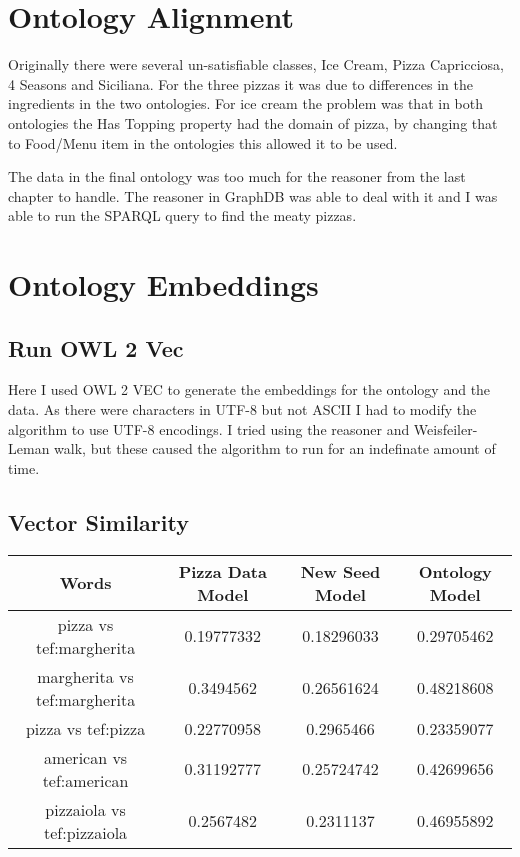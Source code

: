 \documentclass[11pt]{report} %
\begin{document}
\chapter{Ontology Alignment}
Originally there were several un-satisfiable classes, Ice Cream, Pizza Capricciosa, 4 Seasons and Siciliana.
For the three pizzas it was due to differences in the ingredients in the two ontologies.
For ice cream the problem was that in both ontologies the Has Topping property had the domain of pizza, by changing that to Food/Menu item in the ontologies this allowed it to be used.

The data in the final ontology was too much for the reasoner from the last chapter to handle.
The reasoner in GraphDB was able to deal with it and I was able to run the SPARQL query to find the meaty pizzas.



\chapter{Ontology Embeddings}

\section{Run OWL 2 Vec}
Here I used OWL 2 VEC to generate the embeddings for the ontology and the data.
As there were characters in UTF-8 but not ASCII I had to modify the algorithm to use UTF-8 encodings.
I tried using the reasoner and Weisfeiler-Leman walk, but these caused the algorithm to run for an indefinate amount of time.

\section{Vector Similarity}
\begin{center}
	\begin{tabular}{ | c | c | c | c |}
		\hline
		\textbf{Words} & \textbf{Pizza Data Model} & \textbf{New Seed Model} & \textbf{Ontology Model} \\
		\hline
		pizza vs tef:margherita & 0.19777332 & 0.18296033 & 0.29705462 \\
		\hline
		margherita vs tef:margherita & 0.3494562 & 0.26561624 & 0.48218608 \\
		\hline
		pizza vs tef:pizza & 0.22770958 & 0.2965466 & 0.23359077 \\
		\hline
		american vs tef:american & 0.31192777 & 0.25724742 & 0.42699656 \\
		\hline
		pizzaiola vs tef:pizzaiola & 0.2567482 & 0.2311137 & 0.46955892 \\
		\hline
	\end{tabular}
\end{center}
\end{document}
